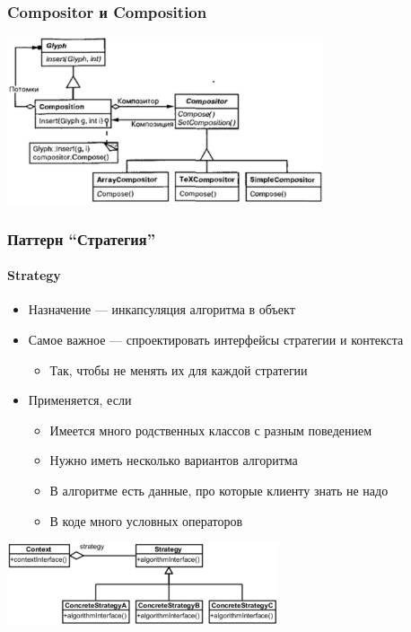 \documentclass{../../slides-style}
\begin{document}
    \begin{frame}
        \frametitle{Compositor и Composition}
        \begin{center}
            \includegraphics[width=0.7\textwidth]{compositor.png}
        \end{center}
    \end{frame}

    \begin{frame}
        \frametitle{Паттерн \enquote{Стратегия}}
        \framesubtitle{Strategy}
        \begin{itemize}
            \item Назначение --- инкапсуляция алгоритма в объект
            \item Самое важное --- спроектировать интерфейсы стратегии и контекста
            \begin{itemize}
                \item Так, чтобы не менять их для каждой стратегии
            \end{itemize}
            \item Применяется, если
            \begin{itemize}
                \item Имеется много родственных классов с разным поведением
                \item Нужно иметь несколько вариантов алгоритма
                \item В алгоритме есть данные, про которые клиенту знать не надо
                \item В коде много условных операторов
            \end{itemize}
        \end{itemize}
        \begin{center}
            \includegraphics[width=0.6\textwidth]{strategy.png}
        \end{center}
    \end{frame}
\end{document}
